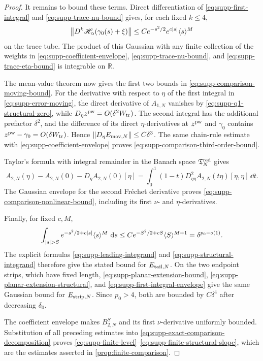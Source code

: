 \begin{proof}
It remains to bound these terms.  Direct differentiation of
\eqref{eq:supp-first-integral} and
\eqref{eq:supp-trace-nu-bound} gives, for each fixed \(k\le4\),
\begin{equation}
 \left\lVert D^k\mathscr H_\alpha(\gamma_0(s)+\xi)\right\rVert
 \le Ce^{-s^2/2}e^{c\left\lvert s\right\rvert}\langle s\rangle^M
 \label{eq:supp-first-integral-envelope}
\end{equation}
on the trace tube.  The product of this Gaussian with any finite collection
of the weights in \eqref{eq:supp-coefficient-envelope},
\eqref{eq:supp-trace-nu-bound}, and
\eqref{eq:supp-trace-eta-bound} is integrable on \(\mathbb R\).

The mean-value theorem now gives the first two bounds in
\eqref{eq:supp-comparison-moving-bound}.  For the derivative with respect to
\(\eta\) of
the first integral in \eqref{eq:supp-error-moving}, the direct derivative of
\(A_{1,N}\) vanishes by \eqref{eq:supp-q1-structural-zero}, while
\(D_\eta z^{\rm pw}=O(\delta^2W_{\rm tr})\).  The second integral has the
additional prefactor \(\delta^2\), and the difference of its direct
\(\eta\)-derivatives at \(z^{\rm pw}\) and \(\gamma_0\) contains
\(z^{\rm pw}-\gamma_0=O(\delta W_{\rm tr})\).  Hence
\(\left\lVert D_\eta E_{{\rm mov},N}\right\rVert\le C\delta^3\).
The same chain-rule estimate with
\eqref{eq:supp-coefficient-envelope} proves
\eqref{eq:supp-comparison-third-order-bound}.

Taylor's formula with integral remainder in the Banach space
\(\mathfrak T_N^{\rm red}\) gives
\begin{equation}
 A_{2,N}(\eta)-A_{2,N}(0)-D_\eta A_{2,N}(0)[\eta]
 =\int_0^1(1-t)D_{\eta\eta}^2A_{2,N}(t\eta)[\eta,\eta]\,\dd t.
 \label{eq:supp-structural-taylor-formula}
\end{equation}
The Gaussian envelope for the second Fr\'echet derivative proves
\eqref{eq:supp-comparison-nonlinear-bound}, including its first
\(\nu\)- and \(\eta\)-derivatives.

Finally, for fixed \(c,M\),
\begin{equation}
 \int_{\left\lvert s\right\rvert>S}e^{-s^2/2+c\left\lvert s\right\rvert}\langle s\rangle^M\,\,\mathrm d s
 \le Ce^{-S^2/2+cS}\langle S\rangle^{M+1}
 =\delta^{p_0-o(1)}.
 \label{eq:supp-gaussian-tail}
\end{equation}
The explicit formulas \eqref{eq:supp-leading-integrand} and
\eqref{eq:supp-structural-integrand} therefore give the stated bound for
\(E_{{\rm tail},N}\).  On the two endpoint strips, which have fixed length,
\eqref{eq:supp-planar-extension-bound},
\eqref{eq:supp-planar-extension-structural}, and
\eqref{eq:supp-first-integral-envelope} give the same Gaussian bound for
\(E_{{\rm strip},N}\).  Since \(p_0>4\), both are bounded by
\(C\delta^4\) after decreasing \(\delta_0\).

The coefficient envelope makes \(B_{2,N}^S\) and its first
\(\nu\)-derivative uniformly bounded.  Substitution of all preceding
estimates into \eqref{eq:supp-exact-comparison-decomposition} proves
\eqref{eq:supp-finite-level}--\eqref{eq:supp-finite-structural-slope},
which are the estimates asserted in \cref{prop:finite-comparison}.
\end{proof}
